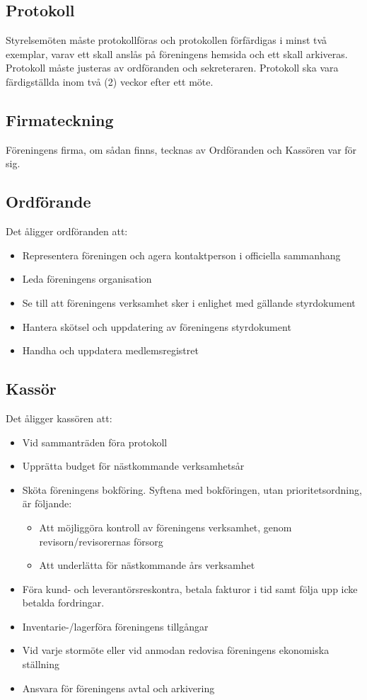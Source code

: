 \documentclass[11pt,a4paper]{article}
\begin{document}
\subsection{Protokoll}
Styrelsemöten måste protokollföras och protokollen förfärdigas i minst två exemplar, varav ett skall anslås på föreningens hemsida och ett skall arkiveras. Protokoll måste justeras av ordföranden och sekreteraren. Protokoll ska vara färdigställda inom två (2) veckor efter ett möte.
\subsection{Firmateckning}
Föreningens firma, om sådan finns, tecknas av Ordföranden och Kassören var för sig.
\subsection{Ordförande}\label{sec:ordf}
Det åligger ordföranden att:
\begin{itemize}
	\item Representera föreningen och agera kontaktperson i officiella sammanhang
	\item Leda föreningens organisation
	\item Se till att föreningens verksamhet sker i enlighet med gällande styrdokument
	\item Hantera skötsel och uppdatering av föreningens styrdokument
	\item Handha och uppdatera medlemsregistret
\end{itemize}
\subsection{Kassör}\label{sec:cash}
Det åligger kassören att:
\begin{itemize}
	\item Vid sammanträden föra protokoll
	\item Upprätta budget för nästkommande verksamhetsår
	\item Sköta föreningens bokföring. Syftena med bokföringen, utan prioritetsordning, är följande:
\begin{itemize}
	\item Att möjliggöra kontroll av föreningens verksamhet, genom revisorn/revisorernas försorg
	\item Att underlätta för nästkommande års verksamhet
\end{itemize}
\item Föra kund- och leverantörsreskontra, betala fakturor i tid samt följa upp icke betalda fordringar.
\item Inventarie-/lagerföra föreningens tillgångar
\item Vid varje stormöte eller vid anmodan redovisa föreningens ekonomiska ställning
\item Ansvara för föreningens avtal och arkivering
\end{itemize}
\end{document}
